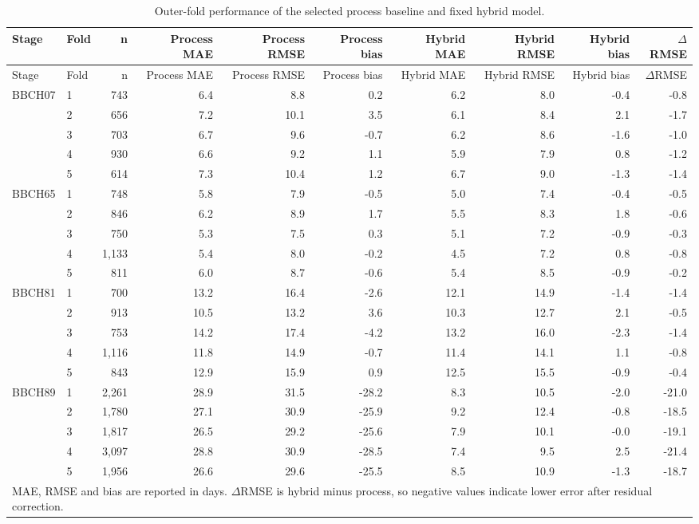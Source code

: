 \documentclass[10pt]{article}
\begin{document}
\begin{landscape}
\begin{longtable}{llrrrrrrrr}
\caption{Outer-fold performance of the selected process baseline and fixed hybrid model.}\label{tab:supp_fold_performance}\\
\toprule
Stage & Fold & n & Process MAE & Process RMSE & Process bias & Hybrid MAE & Hybrid RMSE & Hybrid bias & $\Delta$RMSE \\
\midrule
\endfirsthead
\toprule
Stage & Fold & n & Process MAE & Process RMSE & Process bias & Hybrid MAE & Hybrid RMSE & Hybrid bias & $\Delta$RMSE \\
\midrule
\endhead
BBCH07 & 1 & 743 & 6.4 & 8.8 & 0.2 & 6.2 & 8.0 & -0.4 & -0.8 \\
 & 2 & 656 & 7.2 & 10.1 & 3.5 & 6.1 & 8.4 & 2.1 & -1.7 \\
 & 3 & 703 & 6.7 & 9.6 & -0.7 & 6.2 & 8.6 & -1.6 & -1.0 \\
 & 4 & 930 & 6.6 & 9.2 & 1.1 & 5.9 & 7.9 & 0.8 & -1.2 \\
 & 5 & 614 & 7.3 & 10.4 & 1.2 & 6.7 & 9.0 & -1.3 & -1.4 \\
BBCH65 & 1 & 748 & 5.8 & 7.9 & -0.5 & 5.0 & 7.4 & -0.4 & -0.5 \\
 & 2 & 846 & 6.2 & 8.9 & 1.7 & 5.5 & 8.3 & 1.8 & -0.6 \\
 & 3 & 750 & 5.3 & 7.5 & 0.3 & 5.1 & 7.2 & -0.9 & -0.3 \\
 & 4 & 1,133 & 5.4 & 8.0 & -0.2 & 4.5 & 7.2 & 0.8 & -0.8 \\
 & 5 & 811 & 6.0 & 8.7 & -0.6 & 5.4 & 8.5 & -0.9 & -0.2 \\
BBCH81 & 1 & 700 & 13.2 & 16.4 & -2.6 & 12.1 & 14.9 & -1.4 & -1.4 \\
 & 2 & 913 & 10.5 & 13.2 & 3.6 & 10.3 & 12.7 & 2.1 & -0.5 \\
 & 3 & 753 & 14.2 & 17.4 & -4.2 & 13.2 & 16.0 & -2.3 & -1.4 \\
 & 4 & 1,116 & 11.8 & 14.9 & -0.7 & 11.4 & 14.1 & 1.1 & -0.8 \\
 & 5 & 843 & 12.9 & 15.9 & 0.9 & 12.5 & 15.5 & -0.9 & -0.4 \\
BBCH89 & 1 & 2,261 & 28.9 & 31.5 & -28.2 & 8.3 & 10.5 & -2.0 & -21.0 \\
 & 2 & 1,780 & 27.1 & 30.9 & -25.9 & 9.2 & 12.4 & -0.8 & -18.5 \\
 & 3 & 1,817 & 26.5 & 29.2 & -25.6 & 7.9 & 10.1 & -0.0 & -19.1 \\
 & 4 & 3,097 & 28.8 & 30.9 & -28.5 & 7.4 & 9.5 & 2.5 & -21.4 \\
 & 5 & 1,956 & 26.6 & 29.6 & -25.5 & 8.5 & 10.9 & -1.3 & -18.7 \\
\bottomrule
\multicolumn{10}{l}{\footnotesize MAE, RMSE and bias are reported in days. $\Delta$RMSE is hybrid minus process, so negative values indicate lower error after residual correction.}
\end{longtable}
\end{landscape}
\end{document}
